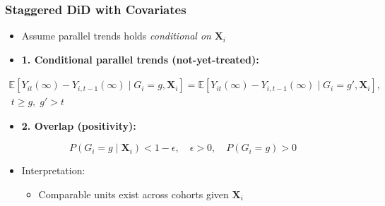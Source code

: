 \documentclass[12pt, compress]{beamer}
\begin{document}
\begin{frame}
	\frametitle{Staggered DiD with Covariates}

\begin{itemize}
	\item Assume parallel trends holds \textit{conditional on} $\mathbf{X}_i$
	
	\medskip
	
	\item \textbf{1. Conditional parallel trends (not-yet-treated):}
\end{itemize}
{\footnotesize{
\begin{align*}
\mathbb{E}\!\left[Y_{it}(\infty)-Y_{i,t-1}(\infty)\mid G_i=g,\mathbf{X}_i\right]
=
\mathbb{E}\!\left[Y_{it}(\infty)-Y_{i,t-1}(\infty)\mid G_i=g',\mathbf{X}_i\right],
\\
\ t \geq g,\; g' > t
\end{align*}
}}
\begin{itemize}
	\item \textbf{2. Overlap (positivity):}
\end{itemize}
\[
P(G_i = g \mid \mathbf{X}_i) < 1 - \epsilon, \quad \epsilon > 0, \quad P(G_i = g) > 0
\]

\begin{itemize}
	\item Interpretation:
	\begin{itemize}
		\item Comparable units exist across cohorts given $\mathbf{X}_i$
	\end{itemize}
\end{itemize}

\end{frame}
\end{document}
